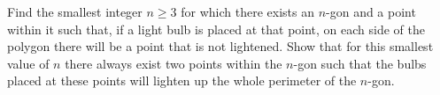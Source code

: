Find the smallest integer $n\ge3$ for which there exists an $n$-gon and a point within it such that, if a light bulb is placed at that point, on each side of the polygon there will be a point that is not lightened. Show that for this smallest value of $n$ there always exist two points within the $n$-gon such that the bulbs placed at these points will lighten up the whole perimeter of the $n$-gon.